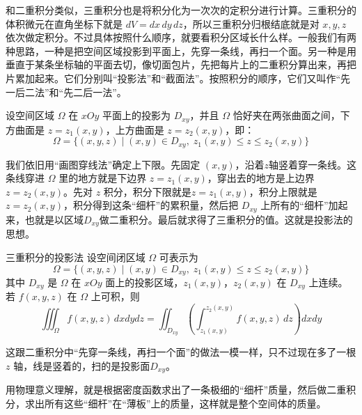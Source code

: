 和二重积分类似，三重积分也是将积分化为一次次的定积分进行计算。三重积分的体积微元在直角坐标下就是 \(dV = dx\,dy\,dz\)，所以三重积分归根结底就是对 \(x,y,z\) 依次做定积分。不过具体按照什么顺序，就要看积分区域长什么样。一般我们有两种思路，一种是把空间区域投影到平面上，先穿一条线，再扫一个面。另一种是用垂直于某条坐标轴的平面去切，像切面包片，先把每片上的二重积分算出来，再把片累加起来。它们分别叫“投影法”和“截面法”。按照积分的顺序，它们又叫作“先一后二法”和“先二后一法”。

设空间区域 \(\Omega\) 在 \(xOy\) 平面上的投影为 \(D_{xy}\)，并且 \(\Omega\) 恰好夹在两张曲面之间，下方曲面是 \(z=z_1(x,y)\)，上方曲面是 \(z=z_2(x,y)\)，即：
\[
\Omega = \{(x,y,z) \mid (x,y)\in D_{xy},\; z_1(x,y) \le z \le z_2(x,y)\}
\]

我们依旧用“画图穿线法”确定上下限。先固定 \((x,y)\)，沿着$z$轴竖着穿一条线。这条线穿进 \(\Omega\) 里的地方就是下边界 \(z=z_1(x,y)\)，穿出去的地方是上边界 \(z=z_2(x,y)\)。先对 \(z\) 积分，积分下限就是\(z=z_1(x,y)\)，积分上限就是\(z=z_2(x,y)\)，积分得到这条“细杆”的累积量，然后把 \(D_{xy}\) 上所有的“细杆”加起来，也就是以区域\(D_{xy}\)做二重积分。最后就求得了三重积分的值。这就是投影法的思想。

\begin{theorem}{三重积分的投影法}{}
设空间闭区域 \(\Omega\) 可表示为
\[
\Omega = \{(x,y,z) \mid (x,y) \in D_{xy},\; z_1(x,y) \le z \le z_2(x,y)\}
\]
其中 \(D_{xy}\) 是 \(\Omega\) 在 \(xOy\) 面上的投影区域，\(z_1(x,y)\)，\(z_2(x,y)\) 在 \(D_{xy}\) 上连续。若 \(f(x,y,z)\) 在 \(\Omega\) 上可积，则
\[
\iiint_{\Omega} f(x,y,z)\,dxdydz
= \iint_{D_{xy}} \left( \int_{z_1(x,y)}^{z_2(x,y)} f(x,y,z)\,dz \right) dxdy
\]
\end{theorem}

这跟二重积分中“先穿一条线，再扫一个面”的做法一模一样，只不过现在多了一根 \(z\) 轴，线是竖着的，扫的是投影面\(D_{xy}\)。

用物理意义理解，就是根据密度函数求出了一条极细的“细杆”质量，然后做二重积分，求出所有这些“细杆”在“薄板”上的质量，这样就是整个空间体的质量。

